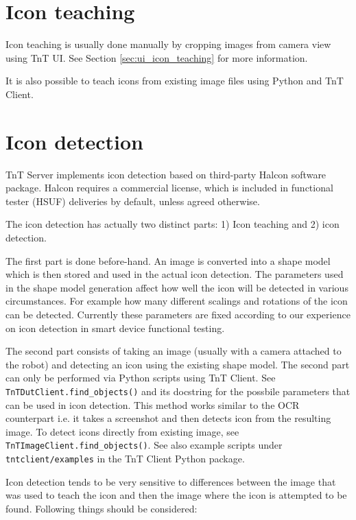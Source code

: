 \section{Icon teaching}

Icon teaching is usually done manually by cropping images from camera view using TnT UI. See Section \ref{sec:ui_icon_teaching} for more information.

It is also possible to teach icons from existing image files using Python and TnT Client.

\section{Icon detection}

TnT Server implements icon detection based on third-party Halcon software package. Halcon requires a commercial license, which is included in functional tester (HSUF) deliveries by default, unless agreed otherwise.

The icon detection has actually two distinct parts: 1) Icon teaching and 2) icon detection. 

The first part is done before-hand. An image is converted into a shape model which is then stored and used in the actual icon detection. The parameters used in the shape model generation affect how well the icon will be detected in various circumstances. For example how many different scalings and rotations of the icon can be detected. Currently these parameters are fixed according to our experience on icon detection in smart device functional testing.

The second part consists of taking an image (usually with a camera attached to the robot) and detecting an icon using the existing shape model. The second part can only be performed via Python scripts using TnT Client. See \texttt{TnTDutClient.find\_objects()} and its docstring for the possbile parameters that can be used in icon detection. This method works similar to the OCR counterpart i.e. it takes a screenshot and then detects icon from the resulting image. To detect icons directly from existing image, see \texttt{TnTImageClient.find\_objects()}. See also example scripts under \texttt{tntclient/examples} in the TnT Client Python package.

Icon detection tends to be very sensitive to differences between the image that was used to teach the icon and then the image where the icon is attempted to be found. Following things should be considered:


